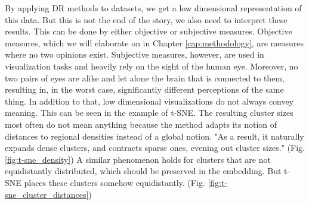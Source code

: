 By applying DR methods to datasets, we get a low dimensional representation of this data. But this is not the end of the story, we also need to interpret these results. This can be done by either objective or subjective measures. Objective measures, which we will elaborate on in Chapter \ref{cap:methodology}, are measures where no two opinions exist. Subjective measures, however, are used in visualization tasks and heavily rely on the sight of the human eye. Moreover, no two pairs of eyes are alike and let alone the brain that is connected to them, resulting in, in the worst case, significantly different perceptions of the same thing. In addition to that, low dimensional visualizations do not always convey meaning. This can be seen in the example of t-SNE. The resulting cluster sizes most often do not mean anything because the method adapts its notion of distances to regional densities instead of a global notion. "As a result, it naturally expands dense clusters, and contracts sparse ones, evening out cluster sizes." \cite{how_t-SNE16} (Fig. \ref{fig:t-sne_density}) A similar phenomenon holds for clusters that are not equidistantly distributed, which should be preserved in the embedding. But t-SNE places these clusters somehow equidistantly. (Fig. \ref{fig:t-sne_cluster_distances}) \cite{how_t-SNE16}

